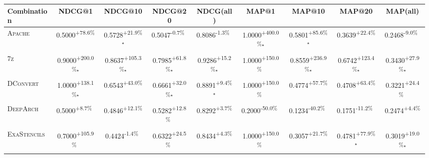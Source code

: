\begin{table}[htbp]
\centering
\renewcommand{\arraystretch}{1.2}
\begin{tabular}{l|cccc|cccc}
\hline
Combination & NDCG@1 & NDCG@10 & NDCG@20 & NDCG(all) & MAP@1 & MAP@10 & MAP@20 & MAP(all) \\ \hline
\textsc{Apache} & \cellcolor{green!30}0.5000\textsuperscript{+78.6\%}$^{\,\,\,}$ & \cellcolor{green!30}0.5728\textsuperscript{+21.9\%}$^\star$ & \cellcolor{red!30}0.5047\textsuperscript{-0.7\%}$^{\,\,\,}$ & \cellcolor{red!30}0.8086\textsuperscript{-1.3\%}$^{\,\,\,}$ & \cellcolor{green!30}1.0000\textsuperscript{+400.0\%}$^\star$ & \cellcolor{green!30}0.5801\textsuperscript{+85.6\%}$^\star$ & \cellcolor{green!30}0.3639\textsuperscript{+22.4\%}$^{\,\,\,}$ & \cellcolor{red!30}0.2468\textsuperscript{-9.0\%}$^{\,\,\,}$ \\
\textsc{7z} & \cellcolor{green!30}0.9000\textsuperscript{+200.0\%}$^\star$ & \cellcolor{green!30}0.8637\textsuperscript{+105.3\%}$^\star$ & \cellcolor{green!30}0.7985\textsuperscript{+61.8\%}$^\star$ & \cellcolor{green!30}0.9286\textsuperscript{+15.2\%}$^\star$ & \cellcolor{green!30}1.0000\textsuperscript{+150.0\%}$^{\,\,\,}$ & \cellcolor{green!30}0.8559\textsuperscript{+236.9\%}$^\star$ & \cellcolor{green!30}0.6742\textsuperscript{+123.4\%}$^\star$ & \cellcolor{green!30}0.3430\textsuperscript{+27.9\%}$^\star$ \\
\textsc{DConvert} & \cellcolor{green!30}1.0000\textsuperscript{+138.1\%}$^\star$ & \cellcolor{green!30}0.6543\textsuperscript{+43.0\%}$^{\,\,\,}$ & \cellcolor{green!30}0.6661\textsuperscript{+32.0\%}$^\star$ & \cellcolor{green!30}0.8891\textsuperscript{+9.4\%}$^\star$ & \cellcolor{green!30}1.0000\textsuperscript{+150.0\%}$^{\,\,\,}$ & \cellcolor{green!30}0.4774\textsuperscript{+57.7\%}$^{\,\,\,}$ & \cellcolor{green!30}0.4708\textsuperscript{+63.4\%}$^{\,\,\,}$ & \cellcolor{green!30}0.3221\textsuperscript{+24.4\%}$^{\,\,\,}$ \\
\textsc{DeepArch} & \cellcolor{green!30}0.5000\textsuperscript{+8.7\%}$^{\,\,\,}$ & \cellcolor{green!30}0.4846\textsuperscript{+12.1\%}$^{\,\,\,}$ & \cellcolor{green!30}0.5282\textsuperscript{+12.8\%}$^{\,\,\,}$ & \cellcolor{green!30}0.8292\textsuperscript{+3.7\%}$^{\,\,\,}$ & \cellcolor{red!30}0.2000\textsuperscript{-50.0\%}$^{\,\,\,}$ & \cellcolor{red!30}0.1234\textsuperscript{-40.2\%}$^{\,\,\,}$ & \cellcolor{red!30}0.1751\textsuperscript{-11.2\%}$^{\,\,\,}$ & \cellcolor{green!30}0.2474\textsuperscript{+4.4\%}$^{\,\,\,}$ \\
\textsc{ExaStencils} & \cellcolor{green!30}0.7000\textsuperscript{+105.9\%}$^{\,\,\,}$ & \cellcolor{red!30}0.4424\textsuperscript{-1.4\%}$^{\,\,\,}$ & \cellcolor{green!30}0.6322\textsuperscript{+24.5\%}$^{\,\,\,}$ & \cellcolor{green!30}0.8434\textsuperscript{+4.3\%}$^{\,\,\,}$ & \cellcolor{green!30}1.0000\textsuperscript{+150.0\%}$^{\,\,\,}$ & \cellcolor{green!30}0.3057\textsuperscript{+21.7\%}$^{\,\,\,}$ & \cellcolor{green!30}0.4781\textsuperscript{+77.9\%}$^\star$ & \cellcolor{green!30}0.3019\textsuperscript{+19.0\%}$^\star$ \\

\end{tabular}
\end{table}
